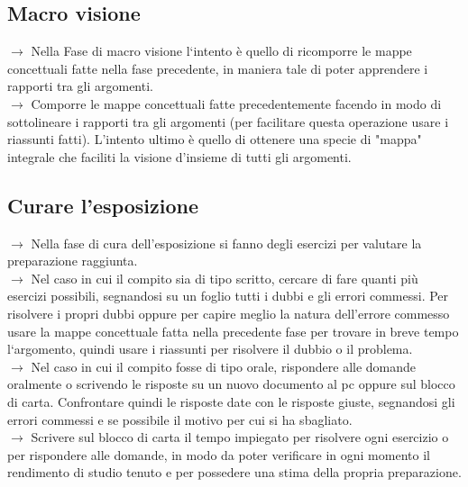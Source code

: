 \documentclass[11pt,a4paper]{article}
\begin{document}
\subsection{Macro visione}
$\rightarrow$ Nella Fase di macro visione l`intento è quello di ricomporre le mappe concettuali fatte nella fase precedente, in maniera tale di poter apprendere i rapporti tra gli argomenti.\\
$\rightarrow$ Comporre le mappe concettuali fatte precedentemente facendo in modo di sottolineare i rapporti tra gli argomenti (per facilitare questa operazione usare i riassunti fatti). L'intento ultimo è quello di ottenere una specie di "mappa" integrale che faciliti la visione d'insieme di tutti gli argomenti. \\

\subsection{Curare l'esposizione}
$\rightarrow$ Nella fase di cura dell'esposizione si fanno degli esercizi per valutare la preparazione raggiunta.\\
$\rightarrow$ Nel caso in cui il compito sia di tipo scritto, cercare di fare quanti più esercizi possibili, segnandosi su un foglio tutti i dubbi e gli errori commessi. Per risolvere i propri dubbi oppure per capire meglio la natura dell'errore commesso usare la mappe concettuale fatta nella precedente fase per trovare in breve tempo l`argomento, quindi usare i riassunti per risolvere il dubbio o il problema.\\
$\rightarrow$ Nel caso in cui il compito fosse di tipo orale, rispondere alle domande oralmente o scrivendo le risposte su un nuovo documento al pc oppure sul blocco di carta. Confrontare quindi le risposte date con le risposte giuste, segnandosi gli errori commessi e se possibile il motivo per cui si ha sbagliato.\\
$\rightarrow$ Scrivere sul blocco di carta il tempo impiegato per risolvere ogni esercizio o per rispondere alle domande, in modo da poter verificare in ogni momento il rendimento di studio tenuto e per possedere una stima della propria preparazione.\\
\end{document}
